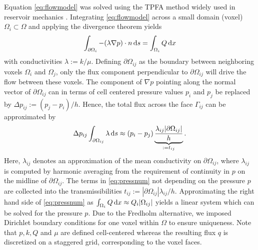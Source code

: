 \documentclass[paper=a4, fontsize=11pt,parskip=half,headings=small]{scrartcl}
\begin{document}
	Equation \eqref{eq:flowmodel} was solved using the TPFA method widely used in reservoir mechanics \cite{Aarnes2007}.
	Integrating \eqref{eq:flowmodel} across a small domain (voxel) $\Omega_i \subset \Omega$ and applying the divergence theorem yields
	\begin{equation}
		\int_{\partial \Omega_i}   -(\lambda \nabla p) \cdot n \,\mathrm{d} s = \int_{\Omega_i}Q \,\mathrm{d} x
	\label{eq:TPFAint}
	\end{equation}
	with conductivities $\lambda := k/\mu$.
	Defining $\partial \Omega_{ij}$ as the boundary between neighboring voxels $\Omega_i$ and $\Omega_j$, only the flux component perpendicular to $\partial \Omega_{ij}$ will drive the flow between these voxels.
	The component of $\nabla p$ pointing along the normal vector of $\partial \Omega_{ij}$ can in terms of cell centered pressure values $p_i$ and $p_j$ be replaced by
 	$\Delta p_{ij} := (p_j - p_i)/h$.
	Hence, the total flux across the face $\Gamma_{ij}$ can be approximated by
	\begin{equation}
		\Delta p_{ij} \int_{\partial \Omega_{ij}}\lambda \,\mathrm{d} s \approx (p_i - p_j) \underbrace{\frac{\lambda_{ij} \vert \partial \Omega_{ij} \vert}{h}}_{:=t_{ij}}.
		\label{eq:pressnum}
	\end{equation}
	Here, $\lambda_{ij}$ denotes an approximation of the mean conductivity on $\partial \Omega_{ij}$, where $\lambda_{ij}$ is computed by harmonic averaging from the requirement of continuity in $p$ on the midline of $\partial \Omega_{ij}$.
	The terms in \eqref{eq:pressnum} not depending on the pressure $p$ are collected into the transmissibilities $t_{ij}:=|\partial \Omega_{ij}|\lambda_{ij}/h$.
	Approximating the right hand side of \eqref{eq:pressnum} as $\int_{\Omega_i}Q \,\mathrm{d} x \approx Q_i |\Omega_{ij}|$ yields a linear system which can be solved for the pressure $p$. Due to the Fredholm alternative, we imposed Dirichlet boundary conditions for one voxel within $\Omega$ to ensure uniqueness.
	Note that $p,k,Q$ and $\mu$ are defined cell-centered whereas the resulting flux $q$ is discretized on a staggered grid, corresponding to the voxel faces.


\end{document}

